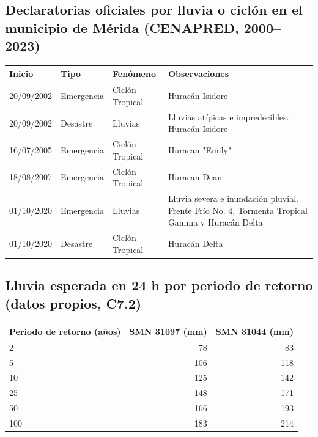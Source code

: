 \documentclass[11pt,a4paper]{article}
\begin{document}
\subsection{Declaratorias oficiales por lluvia o ciclón en el municipio de Mérida (CENAPRED, 2000–2023)}
{\small
\begin{tabularx}{\linewidth}{@{}lllX@{}}
\toprule
\textbf{Inicio} & \textbf{Tipo} & \textbf{Fenómeno} & \textbf{Observaciones} \\ \midrule
20/09/2002 & Emergencia & Ciclón Tropical & Huracán Isidore \\
20/09/2002 & Desastre & Lluvias & Lluvias atípicas e impredecibles. Huracán Isidore \\
16/07/2005 & Emergencia & Ciclón Tropical & Huracan "Emily" \\
18/08/2007 & Emergencia & Ciclón Tropical & Huracan Dean \\
01/10/2020 & Emergencia & Lluvias & Lluvia severa e inundación pluvial. Frente Frío No. 4, Tormenta Tropical Gamma y Huracán Delta \\
01/10/2020 & Desastre & Ciclón Tropical & Huracán Delta \\
\bottomrule
\end{tabularx}}

\subsection{Lluvia esperada en 24 h por periodo de retorno (datos propios, C7.2)}
\begin{tabular}{@{}lrr@{}}
\toprule
\textbf{Periodo de retorno (años)} & \textbf{SMN 31097 (mm)} & \textbf{SMN 31044 (mm)} \\ \midrule
2 & 78 & 83 \\
5 & 106 & 118 \\
10 & 125 & 142 \\
25 & 148 & 171 \\
50 & 166 & 193 \\
100 & 183 & 214 \\
\bottomrule
\end{tabular}
\end{document}

